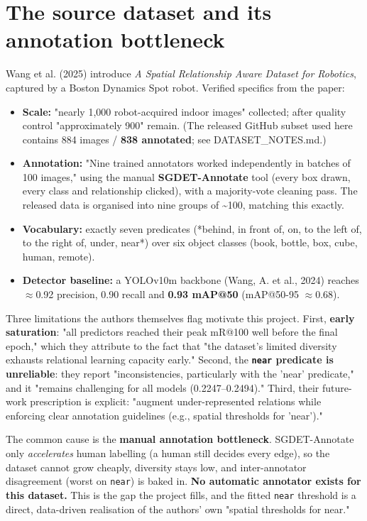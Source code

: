 \section{The source dataset and its annotation bottleneck}

Wang et al. (2025) introduce \textit{A Spatial Relationship Aware Dataset for Robotics}, captured by a Boston Dynamics Spot robot. Verified specifics from the paper:

\begin{itemize}
\item \textbf{Scale:} "nearly 1,000 robot-acquired indoor images" collected; after quality
control "approximately 900" remain. (The released GitHub subset used here contains 884 images / \textbf{838 annotated}; see DATASET\_NOTES.md.)
\item \textbf{Annotation:} "Nine trained annotators worked independently in batches of 100
images," using the manual \textbf{SGDET-Annotate} tool (every box drawn, every class and relationship clicked), with a majority-vote cleaning pass. The released data is organised into nine groups of \textasciitilde{}100, matching this exactly.
\item \textbf{Vocabulary:} exactly seven predicates (*behind, in front of, on, to the left
of, to the right of, under, near*) over six object classes (book, bottle, box, cube, human, remote).
\item \textbf{Detector baseline:} a YOLOv10m backbone (Wang, A. et al., 2024) reaches
$\approx$0.92 precision, 0.90 recall and \textbf{0.93 mAP@50} (mAP@50-95 $\approx$0.68).
\end{itemize}

Three limitations the authors themselves flag motivate this project. First, \textbf{early saturation}: "all predictors reached their peak mR@100 well before the final epoch," which they attribute to the fact that "the dataset's limited diversity exhausts relational learning capacity early." Second, the \textbf{\texttt{near} predicate is unreliable}: they report "inconsistencies, particularly with the 'near' predicate," and it "remains challenging for all models (0.2247--0.2494)." Third, their future-work prescription is explicit: "augment under-represented relations while enforcing clear annotation guidelines (e.g., spatial thresholds for 'near')."

The common cause is the \textbf{manual annotation bottleneck}. SGDET-Annotate only \textit{accelerates} human labelling (a human still decides every edge), so the dataset cannot grow cheaply, diversity stays low, and inter-annotator disagreement (worst on \texttt{near}) is baked in. \textbf{No automatic annotator exists for this dataset.} This is the gap the project fills, and the fitted \texttt{near} threshold is a direct, data-driven realisation of the authors' own "spatial thresholds for near."

